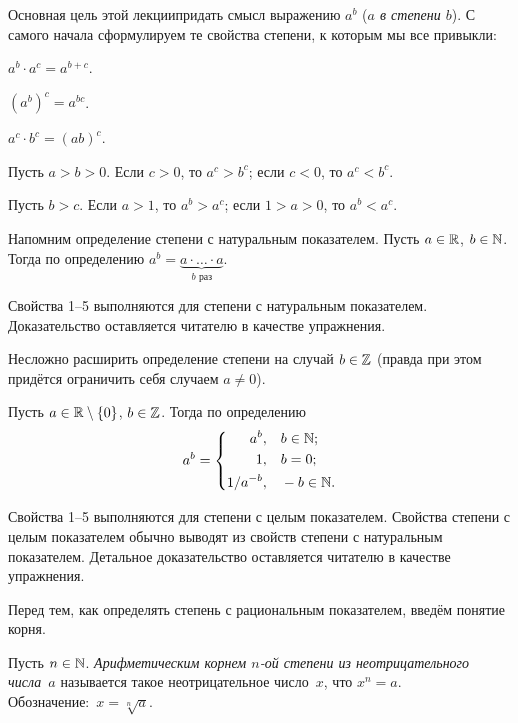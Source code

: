 \documentclass[a4paper,12pt,fleqn]{article}
\begin{document}

Основная цель этой лекции\т придать смысл выражению $a^b$ (\emph{$a$ в степени $b$}). С самого начала сформулируем те свойства степени, к которым мы все привыкли:
\begin{nums}{-3}
\item
\label{additivity}
$a^b \cdot a^c = a^{b+c}$.
\item
\label{composition}
$(a^b)^c = a^{bc}$.
\item
\label{multiplicativity}
$a^c \cdot b^c = (ab)^c$.
\item
\label{base_monotoneness}
Пусть $a > b > 0$. Если $c > 0$, то $a^c > b^c$; если $c < 0$, то $a^c < b^c$.
\item
\label{exponent_monotoneness}
Пусть $b > c$. Если $a > 1$, то $a^b > a^c$; если $1 > a > 0$, то $a^b < a^c$.
\end{nums}

Напомним определение степени с натуральным показателем.
\label{natural}
Пусть $a\in\mathbb{R}$, $b\in\mathbb{N}$. Тогда по определению $a^b = \underbrace{a\cdot\ldots\cdot a}_{b\text{ раз}}$.

Свойства 1--5 выполняются для степени с натуральным показателем.
Доказательство оставляется читателю в качестве упражнения.

Несложно расширить определение степени на случай $b \in \mathbb{Z}$ (правда при этом придётся ограничить себя случаем $a \ne 0$).

\label{integer}
Пусть $a\in\mathbb{R}\setminus\{0\}$, $b\in\mathbb{Z}$. Тогда по определению
\[
a^b = \left\{\begin{aligned}
a^b,&\quad b\in\mathbb{N};\\
1,&\quad b=0;\\
1/a^{-b},&\quad -b\in\mathbb{N}.\\
\end{aligned}\right.
\]

Свойства 1--5 выполняются для степени с целым показателем.
Свойства степени с целым показателем обычно выводят из свойств степени с натуральным показателем. Детальное доказательство оставляется читателю в качестве упражнения.

Перед тем, как определять степень с рациональным показателем, введём понятие корня.

Пусть $n\in\mathbb{N}$. \emph{Арифметическим корнем $n$-ой степени из неотрицательного числа~$a$} называется такое неотрицательное число~$x$, что $x^n=a$.\\ Обозначение:~$x=\sqrt[n]a$.
\end{document}
